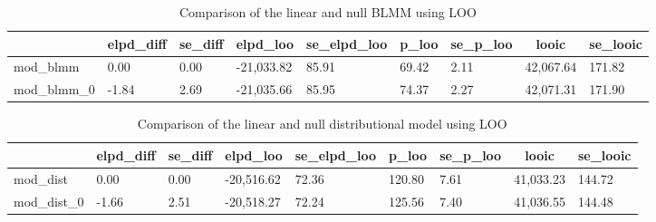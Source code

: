 \documentclass[
  doc,12pt,floatsintext]{apa7}
\begin{document}
\begin{table}[tbp]

\begin{center}
\begin{threeparttable}

\caption{\label{tab:loo-blmm-table}Comparison of the linear and null BLMM using LOO}

\begin{tabular}{lllllllll}
\toprule
 & \multicolumn{1}{c}{elpd\_diff} & \multicolumn{1}{c}{se\_diff} & \multicolumn{1}{c}{elpd\_loo} & \multicolumn{1}{c}{se\_elpd\_loo} & \multicolumn{1}{c}{p\_loo} & \multicolumn{1}{c}{se\_p\_loo} & \multicolumn{1}{c}{looic} & \multicolumn{1}{c}{se\_looic}\\
\midrule
mod\_blmm & 0.00 & 0.00 & -21,033.82 & 85.91 & 69.42 & 2.11 & 42,067.64 & 171.82\\
mod\_blmm\_0 & -1.84 & 2.69 & -21,035.66 & 85.95 & 74.37 & 2.27 & 42,071.31 & 171.90\\
\bottomrule
\end{tabular}

\end{threeparttable}
\end{center}

\end{table}

\begin{table}[tbp]

\begin{center}
\begin{threeparttable}

\caption{\label{tab:loo-dist-table}Comparison of the linear and null distributional model using LOO}

\begin{tabular}{lllllllll}
\toprule
 & \multicolumn{1}{c}{elpd\_diff} & \multicolumn{1}{c}{se\_diff} & \multicolumn{1}{c}{elpd\_loo} & \multicolumn{1}{c}{se\_elpd\_loo} & \multicolumn{1}{c}{p\_loo} & \multicolumn{1}{c}{se\_p\_loo} & \multicolumn{1}{c}{looic} & \multicolumn{1}{c}{se\_looic}\\
\midrule
mod\_dist & 0.00 & 0.00 & -20,516.62 & 72.36 & 120.80 & 7.61 & 41,033.23 & 144.72\\
mod\_dist\_0 & -1.66 & 2.51 & -20,518.27 & 72.24 & 125.56 & 7.40 & 41,036.55 & 144.48\\
\bottomrule
\end{tabular}

\end{threeparttable}
\end{center}

\end{table}
\end{document}
